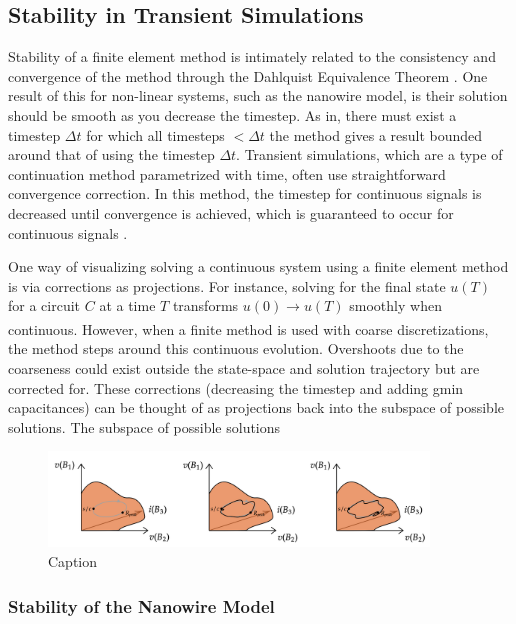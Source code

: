 \documentclass[]{article}
\newcommand{\todoexplain}[2][]{}
\begin{document}
\subsection{Stability in Transient Simulations}

Stability of a finite element method is intimately related to the consistency and convergence of
the method through the Dahlquist Equivalence Theorem \cite{DAHLQUIST}. 
One result of this for non-linear systems,
such as the nanowire model, is their solution should be smooth as you decrease the timestep.
As in, there must exist a timestep $\Delta t$ for which all timesteps $< \Delta t$ the method
gives a result bounded around that of using the timestep $\Delta t$. Transient simulations, which are a 
type of continuation method parametrized with time, often use straightforward convergence correction. 
In this method, the timestep for continuous signals is decreased until convergence is achieved, 
which is guaranteed to occur for continuous signals \cite{spice-book}.

One way of visualizing solving a continuous system using a finite element method is via corrections
as projections. For instance, solving for the final state $u(T)$ for a circuit $C$ at a time $T$ 
transforms $u(0)\xrightarrow[]{} u(T)$ smoothly when continuous. However, when a finite method is used
with coarse discretizations, the method steps around this continuous evolution. Overshoots due to the
coarseness could exist outside the state-space and solution trajectory but are corrected for. 
These corrections (decreasing the timestep and adding gmin capacitances) can be thought of as projections
back into the subspace of possible solutions. The subspace of possible solutions \todoexplain[]{epsilon ball 
around state}

\begin{figure}
    \centering
    \includegraphics[width=0.9\textwidth]{figs/statespaceevolution.png}
    \caption{Caption}
    \label{fig:statespaceevolution}
\end{figure}

\subsubsection{Stability of the Nanowire Model} 
\end{document}
